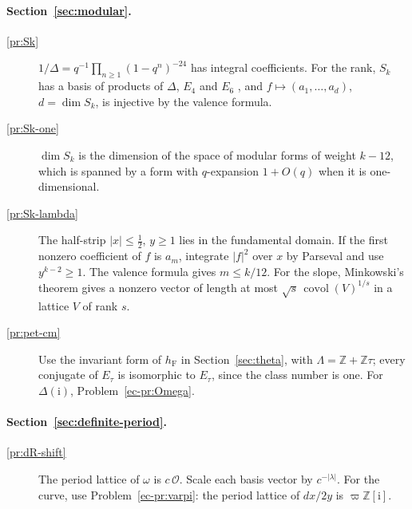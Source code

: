 \documentclass[reqno]{amsart}
\theoremstyle{definition}
\theoremstyle{plain}
\newcommand{\Z}{\mathbb{Z}}
\newcommand{\Oc}{\mathcal{O}}
\newcommand{\ii}{\mathrm{i}}
\newcommand{\covol}{\operatorname{covol}}
\newcommand{\hF}{h_{\mathrm{F}}}
\begin{document}
\paragraph{Section~\ref{sec:modular}.}
\begin{description}
\item[\ref{pr:Sk}] \(1/\Delta = q^{-1}\prod_{n \ge 1}(1-q^n)^{-24}\) has integral coefficients.  For the rank, \(S_k\) has a basis of products of \(\Delta\), \(E_4\) and \(E_6\) \cite[\S VII.3]{SeA}, and \(f \mapsto (a_1, \dots, a_d)\), \(d = \dim S_k\), is injective by the valence formula.
\item[\ref{pr:Sk-one}] \(\dim S_k\) is the dimension of the space of modular forms of weight \(k - 12\), which is spanned by a form with \(q\)-expansion \(1 + O(q)\) when it is one-dimensional.
\item[\ref{pr:Sk-lambda}] The half-strip \(\lvert x \rvert \le \tfrac12\), \(y \ge 1\) lies in the fundamental domain.  If the first nonzero coefficient of \(f\) is \(a_m\), integrate \(\lvert f \rvert^2\) over \(x\) by Parseval and use \(y^{k-2} \ge 1\).  The valence formula gives \(m \le k/12\).  For the slope, Minkowski's theorem gives a nonzero vector of length at most \(\sqrt{s}\,\covol(V)^{1/s}\) in a lattice \(V\) of rank \(s\).
\item[\ref{pr:pet-cm}] Use the invariant form of \(\hF\) in Section~\ref{sec:theta}, with \(\Lambda = \Z + \Z\tau\); every conjugate of \(E_\tau\) is isomorphic to \(E_\tau\), since the class number is one.  For \(\Delta(\ii)\), Problem~\ref{ec-pr:Omega}.
\end{description}
\paragraph{Section~\ref{sec:definite-period}.}
\begin{description}
\item[\ref{pr:dR-shift}] The period lattice of \(\omega\) is \(c\,\Oc\).  Scale each basis vector by \(c^{-\lvert\lambda\rvert}\).  For the curve, use Problem~\ref{ec-pr:varpi}: the period lattice of \(dx/2y\) is \(\varpi\Z[\ii]\).
\end{description}
\end{document}
